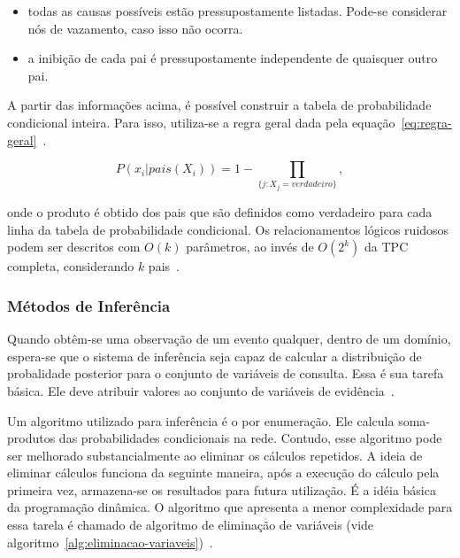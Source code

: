 \begin{itemize}
    \item todas as causas possíveis estão pressupostamente listadas. Pode-se considerar nós de vazamento, caso isso não ocorra.
    \item a inibição de cada pai é pressupostamente independente de quaisquer outro pai.
\end{itemize}

A partir das informações acima, é possível construir a tabela de probabilidade condicional inteira. Para isso, utiliza-se a regra geral dada pela equação~\ref{eq:regra-geral}~\cite{russell:2002}.

\begin{equation}
    \label{eq:regra-geral}
    P(x_i|pais(X_i)) = 1 - \prod_{\{j:X_j = verdadeiro\}} ,
\end{equation}

onde o produto é obtido dos pais que são definidos como verdadeiro para cada linha da tabela de probabilidade condicional. Os relacionamentos lógicos ruidosos podem ser descritos com $O(k)$ parâmetros, ao invés de $O(2^k)$ da TPC completa, considerando $k$ pais~\cite{russell:2002}.

\subsubsection{Métodos de Inferência}
Quando obtêm-se uma observação de um evento qualquer, dentro de um domínio, espera-se que o sistema de inferência seja capaz de calcular a distribuição de probalidade posterior para o conjunto de variáveis de consulta. Essa é sua tarefa básica. Ele deve atribuir valores ao conjunto de variáveis de evidência~\cite{russell:2002, faceli:2011}.

Um algoritmo utilizado para inferência é o por enumeração. Ele calcula soma-produtos das probabilidades condicionais na rede. Contudo, esse algoritmo pode ser melhorado substancialmente ao eliminar os cálculos repetidos. A ideia de eliminar cálculos funciona da seguinte maneira, após a execução do cálculo pela primeira vez, armazena-se os resultados para futura utilização. É a idéia básica da programação dinâmica. O algoritmo que apresenta a menor complexidade para essa tarela é chamado de algoritmo de eliminação de variáveis (vide algoritmo~\ref{alg:eliminacao-variaveis})~\cite{russell:2002}.

